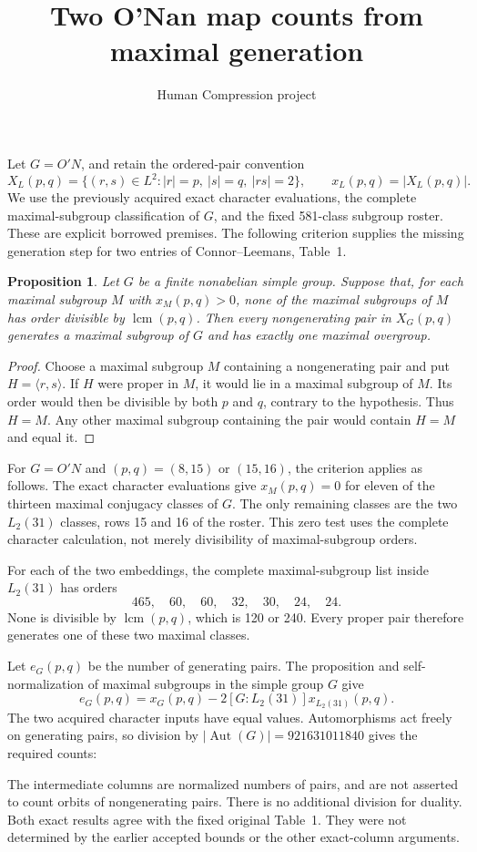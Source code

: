 \documentclass[11pt,a4paper]{article}
\title{Two O'Nan map counts from maximal generation}
\author{Human Compression project}\date{}
\newtheorem{proposition}{Proposition}
\begin{document}
\maketitle
Let $G=O'N$, and retain the ordered-pair convention
\[
 X_L(p,q)=\{(r,s)\in L^2:|r|=p,\ |s|=q,\ |rs|=2\},
 \qquad x_L(p,q)=|X_L(p,q)|.
\]
We use the previously acquired exact character evaluations, the
complete maximal-subgroup classification of $G$, and the fixed
581-class subgroup roster. These are explicit borrowed premises.
The following criterion supplies the missing generation step for two
entries of Connor--Leemans, Table~1.

\begin{proposition}
Let $G$ be a finite nonabelian simple group. Suppose that, for each
maximal subgroup $M$ with $x_M(p,q)>0$, none of the maximal subgroups
of $M$ has order divisible by $\operatorname{lcm}(p,q)$. Then every
nongenerating pair in $X_G(p,q)$ generates a maximal subgroup of $G$
and has exactly one maximal overgroup.
\end{proposition}
\begin{proof}
Choose a maximal subgroup $M$ containing a nongenerating pair and
put $H=\langle r,s\rangle$. If $H$ were proper in $M$, it would lie
in a maximal subgroup of $M$. Its order would then be divisible by
both $p$ and $q$, contrary to the hypothesis. Thus $H=M$. Any other
maximal subgroup containing the pair would contain $H=M$ and equal it.
\end{proof}

For $G=O'N$ and $(p,q)=(8,15)$ or $(15,16)$, the criterion applies
as follows.
The exact character evaluations give $x_M(p,q)=0$ for eleven of the
thirteen maximal conjugacy classes of $G$. The only remaining classes
are the two $L_2(31)$ classes, rows 15 and 16 of the roster. This zero
test uses the complete character calculation, not merely divisibility
of maximal-subgroup orders.

For each of the two embeddings, the complete maximal-subgroup list
inside $L_2(31)$ has orders
\[
465,\quad60,\quad60,\quad32,\quad30,\quad24,\quad24.
\]
None is divisible by $\operatorname{lcm}(p,q)$, which is 120 or 240.
Every proper pair therefore generates one of these two maximal classes.

Let $e_G(p,q)$ be the number of generating pairs. The proposition and
self-normalization of maximal subgroups in the simple group $G$ give
\[
e_G(p,q)=x_G(p,q)-2[G:L_2(31)]x_{L_2(31)}(p,q).
\]
The two acquired character inputs have equal values. Automorphisms
act freely on generating pairs, so division by
$|\operatorname{Aut}(G)|=921631011840$ gives the required counts:

The intermediate columns are normalized numbers of pairs, and are
not asserted to count orbits of nongenerating pairs. There is no
additional division for duality. Both exact results agree with the
fixed original Table~1. They were not determined by the earlier
accepted bounds or the other exact-column arguments.
\end{document}
